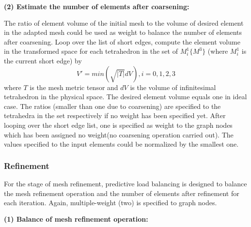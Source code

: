 {\bf (2) Estimate the number of elements after coarsening:}

The ratio of element volume of the initial mesh to the volume of
desired element in the adapted mesh could be used as weight to balance
the number of elements after coarsening. Loop over the list of short edges, compute the
element volume in the transformed space for each tetrahedron in the set of \begin{math}
M_i^1\{M^3\} \end{math} (where \begin{math}M_i^1 \end{math} is the
current short edge) by \begin{equation}
  V'=min(\sqrt{|T|}dV),i=0,1,2,3\end{equation} where \begin{math} T
  \end{math} is the mesh metric tensor and \begin{math}dV\end{math} is
    the volume of infinitesimal tetrahedron in the physical
    space\cite{Li}. The desired element volume equals one in ideal case. The
    ratios (smaller than one due to coarsening) are specified to the tetrahedra in the
    set respectively if no weight has been specified yet. After looping over the
    short edge list, one is specified as weight to the graph nodes
    which has been assigned no weight(no coarsening operation carried
    out). The values specified to the input elements could be normalized by the smallest one.
\subsubsection{Refinement}
For the stage of mesh refinement, predictive load balancing is
designed to balance the mesh refinement operation and the number of
elements after refinement for each iteration. Again, multiple-weight
(two) is specified to
graph nodes.

{\bf (1) Balance of mesh refinement operation:}

